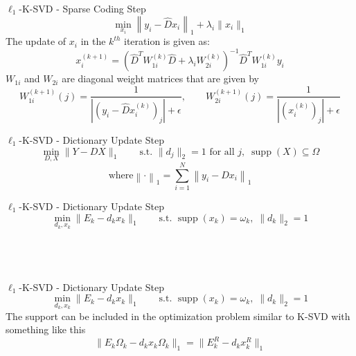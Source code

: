 \documentclass{beamer}
\begin{document}
\begin{frame}{$\ell_1$-K-SVD - Sparse Coding Step}
    \[
    \min_{x_i} \left\|y_i-\hat{D}x_i\right\|_1 + \lambda_i \|x_i\|_1
    \]
    The update of $x_i$ in the $k^{th}$ iteration is given as:
    \[
    x_i^{(k+1)}=
    \left(\hat{D}^{T}W_{1i}^{(k)}\hat{D}+\lambda_i W_{2i}^{(k)}\right)^{-1}
    \hat{D}^{T}W_{1i}^{(k)}y_i
    \]
    $W_{1i}$ and $W_{2i}$ are diagonal weight matrices that are given by
    \[
    W_{1i}^{(k+1)}(j)=\frac{1}{\left|(y_i-\hat{D}x_i^{(k)})_j\right|+\epsilon},
    \qquad
    W_{2i}^{(k+1)}(j)=\frac{1}{\left|(x_i^{(k)})_j\right|+\epsilon}
    \]
\end{frame}

\begin{frame}{$\ell_1$-K-SVD - Dictionary Update Step}
    \[
    \min_{D,X} \|Y-DX\|_1
    \qquad
    \text{s.t. } \|d_j\|_2 = 1 \text{ for all } j,\;
    \operatorname{supp}(X) \subseteq \Omega
    \]
    \[
    \text{where}
    \left\| \cdot \right\|_1 = \sum_{i=1}^{N} \left\| y_i - Dx_i \right\|_1
    \]
\end{frame}

\begin{frame}{$\ell_1$-K-SVD - Dictionary Update Step}
    \[
    \min_{d_k,x_k} \|E_k-d_kx_k\|_1
    \qquad
    \text{s.t. } \operatorname{supp}(x_k)=\omega_k,\; \|d_k\|_2=1
    \]
    \phantom{The support can be included in the optimization problem similar to K-SVD with something like this}
    \[
    \phantom{\|E_k\Omega_k-d_kx_k\Omega_k\|_1
    =
    \|E_k^R-d_kx_k^R\|_1}
    \]
    \phantom{Further simplifying the notation we can say the problem statement as where we need to find the value of u and v.}
    \[
    \phantom{\min_{u,v} \|E-uv^T\|_1
    =
    \min_{u,v}\sum_{i=1}^{N}\|e_i-v_iu\|_1
    \qquad
    \text{s.t. } \|u\|_2=1}
    \]
\end{frame}

\begin{frame}{$\ell_1$-K-SVD - Dictionary Update Step}
    \[
    \min_{d_k,x_k} \|E_k-d_kx_k\|_1
    \qquad
    \text{s.t. } \operatorname{supp}(x_k)=\omega_k,\; \|d_k\|_2=1
    \]
    The support can be included in the optimization problem similar to K-SVD with something like this 
    \[
    \|E_k\Omega_k-d_kx_k\Omega_k\|_1
    =
    \|E_k^R-d_kx_k^R\|_1
    \]
    \phantom{Further simplifying the notation we can say the problem statement as where we need to find the value of u and v.}
    \[
    \phantom{\min_{u,v} \|E-uv^T\|_1
    =
    \min_{u,v}\sum_{i=1}^{N}\|e_i-v_iu\|_1
    \qquad
    \text{s.t. } \|u\|_2=1}
    \]
\end{frame}
\end{document}
